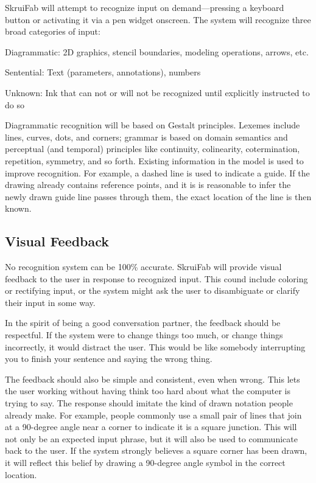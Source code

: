 \documentclass[12pt]{article}
\newenvironment{packed_enum}{
\begin{enumerate}
  \setlength{\itemsep}{1pt}
  \setlength{\parskip}{0pt}
  \setlength{\parsep}{0pt}
}{\end{enumerate}}
\begin{document}
SkruiFab will attempt to recognize input on demand---pressing a
keyboard button or activating it via a pen widget onscreen. The system
will recognize three broad categories of input:

\begin{packed_enum}
\item Diagrammatic: 2D graphics, stencil boundaries, modeling
  operations, arrows, etc.
\item Sentential: Text (parameters, annotations), numbers
\item Unknown: Ink that can not or will not be recognized until
  explicitly instructed to do so
\end{packed_enum}

Diagrammatic recognition will be based on Gestalt principles. Lexemes
include lines, curves, dots, and corners; grammar is based on domain
semantics and perceptual (and temporal) principles like continuity,
colinearity, cotermination, repetition, symmetry, and so
forth. Existing information in the model is used to improve
recognition. For example, a dashed line is used to indicate a
guide. If the drawing already contains reference points, and it is is
reasonable to infer the newly drawn guide line passes through them,
the exact location of the line is then known.

\subsection{Visual Feedback}

No recognition system can be 100\% accurate. SkruiFab will provide
visual feedback to the user in response to recognized input. This
cound include coloring or rectifying input, or the system might ask
the user to disambiguate or clarify their input in some way.

In the spirit of being a good conversation partner, the feedback
should be respectful. If the system were to change things too much, or
change things incorrectly, it would distract the user. This would be
like somebody interrupting you to finish your sentence and saying the
wrong thing.

The feedback should also be simple and consistent, even when
wrong. This lets the user working without having think too hard about
what the computer is trying to say. The response should imitate the
kind of drawn notation people already make. For example, people
commonly use a small pair of lines that join at a 90-degree angle near
a corner to indicate it is a square junction. This will not only be an
expected input phrase, but it will also be used to communicate back to
the user. If the system strongly believes a square corner has been
drawn, it will reflect this belief by drawing a 90-degree angle symbol
in the correct location.
\end{document}
